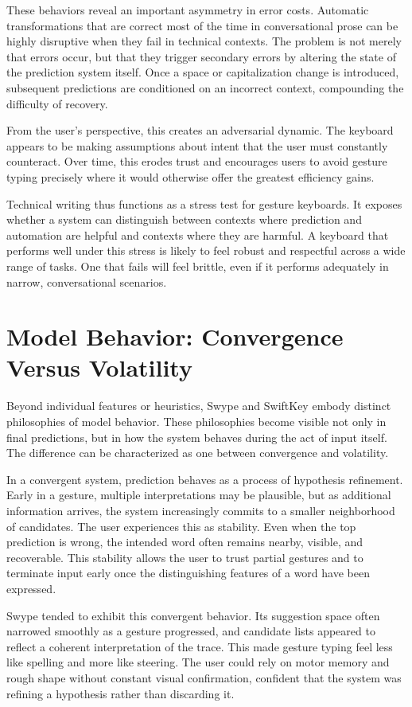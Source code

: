 \documentclass[11pt]{article}
\begin{document}
These behaviors reveal an important asymmetry in error costs. Automatic transformations that are correct most of the time in conversational prose can be highly disruptive when they fail in technical contexts. The problem is not merely that errors occur, but that they trigger secondary errors by altering the state of the prediction system itself. Once a space or capitalization change is introduced, subsequent predictions are conditioned on an incorrect context, compounding the difficulty of recovery.

From the user’s perspective, this creates an adversarial dynamic. The keyboard appears to be making assumptions about intent that the user must constantly counteract. Over time, this erodes trust and encourages users to avoid gesture typing precisely where it would otherwise offer the greatest efficiency gains.

Technical writing thus functions as a stress test for gesture keyboards. It exposes whether a system can distinguish between contexts where prediction and automation are helpful and contexts where they are harmful. A keyboard that performs well under this stress is likely to feel robust and respectful across a wide range of tasks. One that fails will feel brittle, even if it performs adequately in narrow, conversational scenarios.

\section{Model Behavior: Convergence Versus Volatility}

Beyond individual features or heuristics, Swype and SwiftKey embody distinct philosophies of model behavior. These philosophies become visible not only in final predictions, but in how the system behaves during the act of input itself. The difference can be characterized as one between convergence and volatility.

In a convergent system, prediction behaves as a process of hypothesis refinement. Early in a gesture, multiple interpretations may be plausible, but as additional information arrives, the system increasingly commits to a smaller neighborhood of candidates. The user experiences this as stability. Even when the top prediction is wrong, the intended word often remains nearby, visible, and recoverable. This stability allows the user to trust partial gestures and to terminate input early once the distinguishing features of a word have been expressed.

Swype tended to exhibit this convergent behavior. Its suggestion space often narrowed smoothly as a gesture progressed, and candidate lists appeared to reflect a coherent interpretation of the trace. This made gesture typing feel less like spelling and more like steering. The user could rely on motor memory and rough shape without constant visual confirmation, confident that the system was refining a hypothesis rather than discarding it.
\end{document}

